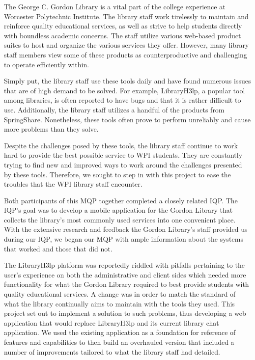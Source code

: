 The George C. Gordon Library is a vital part of the college experience at Worcester Polytechnic Institute. The library staff work tirelessly to maintain and reinforce quality educational services, as well as strive to help students directly with boundless academic concerns. The staff utilize various web-based product suites to host and organize the various services they offer. However, many library staff members view some of these products as counterproductive and challenging to operate efficiently within.

Simply put, the library staff use these tools daily and have found numerous issues that are of high demand to be solved. For example, LibraryH3lp, a popular tool among libraries, is often reported to have bugs and that it is rather difficult to use. Additionally, the library staff utilizes a handful of the products from SpringShare. Nonetheless, these tools often prove to perform unreliably and cause more problems than they solve.

Despite the challenges posed by these tools, the library staff continue to work hard to provide the best possible service to WPI students. They are constantly trying to find new and improved ways to work around the challenges presented by these tools. Therefore, we sought to step in with this project to ease the troubles that the WPI library staff encounter.

Both participants of this MQP together completed a closely related IQP. The IQP's goal was to develop a mobile application for the Gordon Library that collects the library's most commonly used services into one convenient place. With the extensive research and feedback the Gordon Library's staff provided us during our IQP, we began our MQP with ample information about the systems that worked and those that did not.

The LibraryH3lp platform was reportedly riddled with pitfalls pertaining to the user's experience on both the administrative and client sides which needed more functionality for what the Gordon Library required to best provide students with quality educational services. A change was in order to match the standard of what the library continually aims to maintain with the tools they used. This project set out to implement a solution to such problems, thus developing a web application that would replace LibraryH3lp and its current library chat application. We used the existing application as a foundation for reference of features and capabilities to then build an overhauled version that included a number of improvements tailored to what the library staff had detailed.

